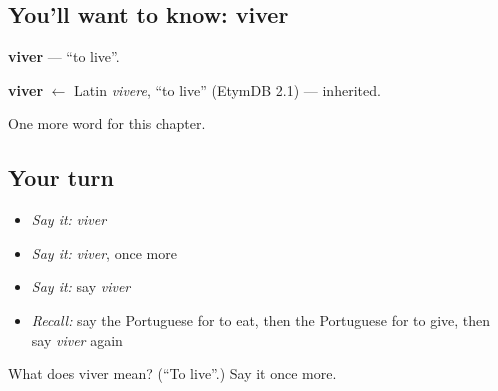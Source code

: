 \subsection*{You'll want to know: viver}
\textbf{viver} — \textquotedblleft{}to live\textquotedblright{}.

\begin{cousinweb}
\textbf{viver} $\leftarrow$ Latin \emph{vivere}, \textquotedblleft{}to live\textquotedblright{} (EtymDB 2.1) — inherited.
\end{cousinweb}

\begin{grammarlens}[title={What you've built}]
One more word for this chapter.
\end{grammarlens}

\subsection*{Your turn}
\begin{itemize}
\raggedright
  \item \emph{Say it:} \emph{viver}
  \item \emph{Say it:} \emph{viver}, once more
  \item \emph{Say it:} say \emph{viver}
  \item \emph{Recall:} say the Portuguese for to eat, then the Portuguese for to give, then say \emph{viver} again
\end{itemize}

\begin{tcolorbox}[breakable,colback=teal!4,colframe=teal!35!black,title={Before you move on}]
What does viver mean? (\textquotedblleft{}To live\textquotedblright{}.) Say it once more.
\end{tcolorbox}
